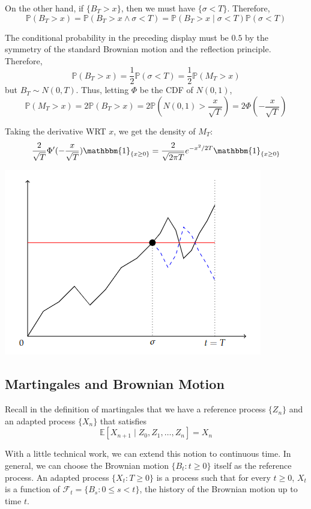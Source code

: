 \documentclass[12pt]{report}
\newcommand{\F}{\mathcal{F}}
\renewcommand{\P}{\mathbb{P}}
\newcommand{\E}{\mathbb{E}}
\newcommand{\ind}{\mathbbm{1}}
\begin{document}
    On the other hand, if $\{B_T > x\}$, then we must have $\{\sigma < T\}$. Therefore, 
    \[\P(B_T > x) = \P(B_T > x \land \sigma < T) = \P(B_T > x \; | \; \sigma  < T) \P(\sigma < T)\]

    The conditional probability in the preceding display must be $0.5$ by the symmetry of the standard Brownian motion and the reflection principle. Therefore,
    \[\P(B_T > x) = \frac{1}{2}\P(\sigma < T) = \frac{1}{2}\P(M_T > x)\]
    but $B_T \sim N(0, T)$. Thus, letting $\Phi$ be the CDF of $N(0, 1)$, 
    \[\P(M_T > x) = 2\P(B_T > x) = 2\P\left(N(0, 1) > \frac{x}{\sqrt T}\right) = 2\Phi\left(-\frac{x}{\sqrt T}\right)\]

    Taking the derivative WRT $x$, we get the density of $M_T$:
    \[\frac{2}{\sqrt T} \Phi'(-\frac{x}{\sqrt T}) \ind_{\{x\geq 0\}} = \frac{2}{\sqrt{2\pi T}} e^{-x^2/2T} \ind_{\{x \geq 0\}}\]

    \begin{center}
        \includegraphics{Images/Reflection principle.png}
    \end{center}

\subsection{Martingales and Brownian Motion} 
    
    Recall in the definition of martingales that we have a reference process $\{Z_n\}$ and an adapted process $\{X_n\}$ that satisfies 
    \[\E[X_{n+1} \; | \; Z_0, Z_1, \dots, Z_n] = X_n\]

    With a little technical work, we can extend this notion to continuous time. In general, we can choose the Brownian motion $\{B_t: t \geq 0\}$ itself as the reference process. An adapted process $\{X_t: T \geq 0\}$ is a process such that for every $t \geq 0$, $X_t$ is a function of $\F_t = \{B_s: 0 \leq s < t\}$, the history of the Brownian motion up to time $t$.
\end{document}

